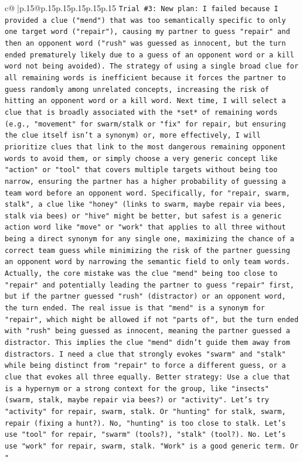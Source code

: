 \documentclass{article}
\begin{document}
{\begin{supertabular}{c@{$\;$}|p{.15\linewidth}@{}p{.15\linewidth}p{.15\linewidth}p{.15\linewidth}p{.15\linewidth}p{.15\linewidth}}
{{{\texttt{Trial \#3: New plan: I failed because I provided a clue ("mend") that was too semantically specific to only one target word ("repair"), causing my partner to guess "repair" and then an opponent word ("rush" was guessed as innocent, but the turn ended prematurely likely due to a guess of an opponent word or a kill word not being avoided). The strategy of using a single broad clue for all remaining words is inefficient because it forces the partner to guess randomly among unrelated concepts, increasing the risk of hitting an opponent word or a kill word. Next time, I will select a clue that is broadly associated with the *set* of remaining words (e.g., "movement" for swarm/stalk or "fix" for repair, but ensuring the clue itself isn't a synonym) or, more effectively, I will prioritize clues that link to the most dangerous remaining opponent words to avoid them, or simply choose a very generic concept like "action" or "tool" that covers multiple targets without being too narrow, ensuring the partner has a higher probability of guessing a team word before an opponent word. Specifically, for "repair, swarm, stalk", a clue like "honey" (links to swarm, maybe repair via bees, stalk via bees) or "hive" might be better, but safest is a generic action word like "move" or "work" that applies to all three without being a direct synonym for any single one, maximizing the chance of a correct team guess while minimizing the risk of the partner guessing an opponent word by narrowing the semantic field to only team words. Actually, the core mistake was the clue "mend" being too close to "repair" and potentially leading the partner to guess "repair" first, but if the partner guessed "rush" (distractor) or an opponent word, the turn ended. The real issue is that "mend" is a synonym for "repair", which might be allowed if not "parts of", but the turn ended with "rush" being guessed as innocent, meaning the partner guessed a distractor. This implies the clue "mend" didn't guide them away from distractors. I need a clue that strongly evokes "swarm" and "stalk" while being distinct from "repair" to force a different guess, or a clue that evokes all three equally. Better strategy: Use a clue that is a hypernym or a strong context for the group, like "insects" (swarm, stalk, maybe repair via bees?) or "activity". Let's try "activity" for repair, swarm, stalk. Or "hunting" for stalk, swarm, repair (fixing a hunt?). No, "hunting" is too close to stalk. Let's use "tool" for repair, "swarm" (tools?), "stalk" (tool?). No. Let's use "work" for repair, swarm, stalk. "Work" is a good generic term. Or "} \\
}}}
\end{supertabular}}
\end{document}
